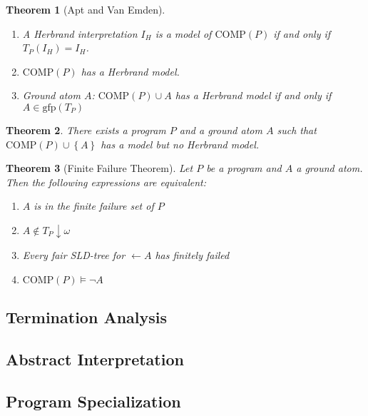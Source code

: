 \documentclass{article}
\newcommand{\brak}[1]{\ensuremath{\left(#1\right)}}
\newcommand{\acl}[1]{\ensuremath{\left\{#1\right\}}}
\newcommand{\acl}[1]{\ensuremath{\left\langle #1\right\rangle}}
\newcommand{\fun}[2]{\ensuremath{#1\brak{#2}}}
\newcommand{\funm}[2]{\ensuremath{\fun{\mbox{#1}}{#2}}}
\newcommand{\COMP}[1]{\funm{COMP}{#1}}
\theoremstyle{definition}
\theoremstyle{plain}
\newtheorem{theorem}{Theorem}
\begin{document}
\begin{theorem}[Apt and Van Emden]
\begin{enumerate}
 \item A Herbrand interpretation $I_H$ is a model of $\funm{COMP}{P}$ if and only if $\fun{T_P}{I_H}=I_H$.
 \item \COMP{P} has a Herbrand model.
 \item Ground atom $A$: $\COMP{P}\cup A$ has a Herbrand model if and only if $A\in\funm{gfp}{T_P}$
\end{enumerate}
\end{theorem}
\begin{theorem}
There exists a program $P$ and a ground atom $A$ such that $\COMP{P}\cup\acl{A}$ has a model but no Herbrand model.
\end{theorem}
\begin{theorem}[Finite Failure Theorem]
Let $P$ be a program and $A$ a ground atom. Then the following expressions are equivalent:
\begin{enumerate}
 \item $A$ is in the finite failure set of $P$
 \item $A\notin T_P\downarrow\omega$
 \item Every fair SLD-tree for $\leftarrow A$ has finitely failed
 \item $\COMP{P}\vDash\neg A$
\end{enumerate}
\end{theorem}
\subsection{Termination Analysis}
\subsection{Abstract Interpretation}
\subsection{Program Specialization}
\end{document}
